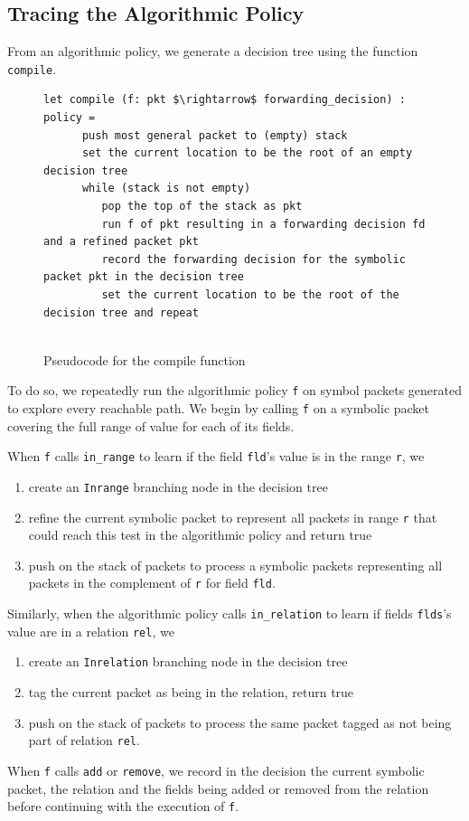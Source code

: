 \documentclass[preprint]{sigplanconf}
\begin{document}
\subsection*{Tracing the Algorithmic Policy}
From an algorithmic policy, we generate a decision tree using the function \lstinline|compile|.  

\begin{figure}[ht]
\begin{lstlisting}[mathescape]
let compile (f: pkt $\rightarrow$ forwarding_decision) : policy =
      push most general packet to (empty) stack
      set the current location to be the root of an empty decision tree
      while (stack is not empty)
         pop the top of the stack as pkt
         run f of pkt resulting in a forwarding decision fd and a refined packet pkt
         record the forwarding decision for the symbolic packet pkt in the decision tree
         set the current location to be the root of the decision tree and repeat
  
\end{lstlisting}
\caption{Pseudocode for the compile function}
\label{fig:compile-pseudo}
\end{figure}

To do so, we repeatedly run the algorithmic policy \lstinline|f| on symbol packets generated to explore every reachable path.
We begin by calling \lstinline|f| on a symbolic packet covering the full range of value for each of its fields.

When \lstinline|f| calls \lstinline|in_range| to learn if the field \lstinline|fld|'s value is in the range \lstinline|r|, we
\begin{enumerate}
\item  create an \lstinline|Inrange| branching node in the decision tree
\item refine the current symbolic packet to represent all packets in range \lstinline|r| that could reach this test in the algorithmic policy and return true
\item push on the stack of packets to process a symbolic packets representing all packets in the complement of \lstinline|r| for field \lstinline|fld|.
\end{enumerate}


Similarly, when the algorithmic policy calls \lstinline|in_relation| to learn if fields \lstinline|flds|'s value are in a relation \lstinline|rel|, we
\begin{enumerate}
  \item create an \lstinline|Inrelation| branching node in the decision tree
  \item tag the current packet as being in the relation, return true
  \item push on the stack of packets to process the same packet tagged as not being part of relation \lstinline|rel|.
\end{enumerate}
When \lstinline|f| calls \lstinline|add| or \lstinline|remove|, we record in the decision the current symbolic packet, the relation and the fields being added or removed from the relation before continuing with the execution of \lstinline|f|.
\end{document}
